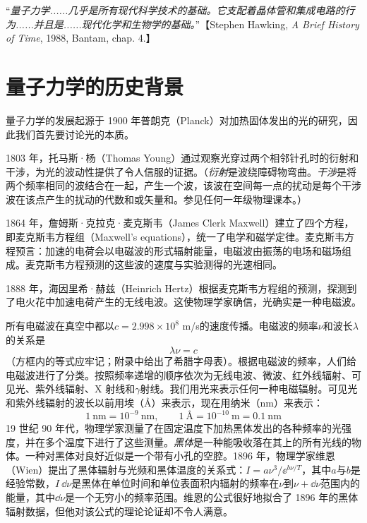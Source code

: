 	“\textit{量子力学......几乎是所有现代科学技术的基础。它支配着晶体管和集成电路的行为......并且是......现代化学和生物学的基础。}”【Stephen Hawking, \textit{A Brief History of Time}, 1988, Bantam, chap. 4.】
	
\section{量子力学的历史背景}
\label{sec:1.2 Historical Background of Quantum Mechanics}
	\noindent 量子力学的发展起源于 1900 年普朗克（Planck）对加热固体发出的光的研究，因此我们首先要讨论光的本质。

	1803 年，托马斯·杨（Thomas Young）通过观察光穿过两个相邻针孔时的衍射和干涉，为光的波动性提供了令人信服的证据。（\textit{衍射}是波绕障碍物弯曲。\textit{干涉}是将两个频率相同的波结合在一起，产生一个波，该波在空间每一点的扰动是每个干涉波在该点产生的扰动的代数和或矢量和。参见任何一年级物理课本。）

	1864 年，詹姆斯·克拉克·麦克斯韦（James Clerk Maxwell）建立了四个方程，即麦克斯韦方程组（Maxwell's equations），统一了电学和磁学定律。麦克斯韦方程预言：加速的电荷会以电磁波的形式辐射能量，电磁波由振荡的电场和磁场组成。麦克斯韦方程预测的这些波的速度与实验测得的光速相同。

	1888 年，海因里希·赫兹（Heinrich Hertz）根据麦克斯韦方程组的预测，探测到了电火花中加速电荷产生的无线电波。这使物理学家确信，光确实是一种电磁波。

	所有电磁波在真空中都以$c = 2.998 \times 10^8$ m/s的速度传播。电磁波的频率$\nu$和波长$\lambda$的关系是
	\begin{equation}
		\boxed{\lambda \nu = c}
		\label{eq:1.1 wavelength and frequency}
	\end{equation}
	（方框内的等式应牢记；附录中给出了希腊字母表）。根据电磁波的频率，人们给电磁波进行了分类。按照频率递增的顺序依次为无线电波、微波、红外线辐射、可见光、紫外线辐射、X 射线和$\gamma$射线。我们用光来表示任何一种电磁辐射。可见光和紫外线辐射的波长以前用埃（\AA）来表示，现在用纳米（nm）来表示：
	\begin{equation}
		\boxed{1 \: \text{nm} = 10^{-9} \: \text{nm}, \qquad 1 \: \text{\AA}= 10^{-10} \: \text{m} = 0.1 \: \text{nm}}
		\label{units:1.2 nm and angstroms}
	\end{equation}
	19 世纪 90 年代，物理学家测量了在固定温度下加热黑体发出的各种频率的光强度，并在多个温度下进行了这些测量。\textit{黑体}是一种能吸收落在其上的所有光线的物体。一种对黑体对良好近似是一个带有小孔的空腔。1896 年，物理学家维恩（Wien）提出了黑体辐射与光频和黑体温度的关系式：$I=a\nu^3/\ee^{b\nu /T}$，其中$a$与$b$是经验常数，$I \:\dd \nu$是黑体在单位时间和单位表面积内辐射的频率在$\nu$到$\nu + \dd \nu$范围内的能量，其中$\dd \nu$是一个无穷小的频率范围。维恩的公式很好地拟合了 1896 年的黑体辐射数据，但他对该公式的理论论证却不令人满意。


